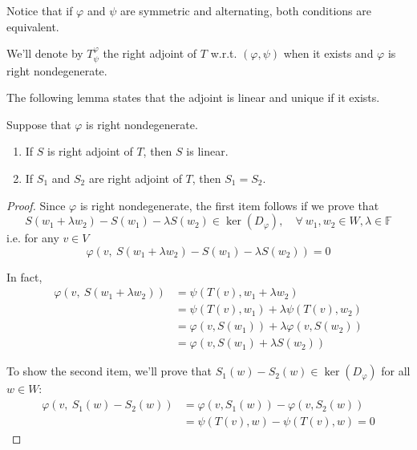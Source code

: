 Notice that if $\varphi$ and $\psi$ are symmetric and alternating, both conditions are equivalent. 

We'll denote by $T_\psi^\varphi$ the right adjoint of $T$ w.r.t. $(\varphi, \psi)$ when it exists and $\varphi$ is right nondegenerate. 

The following lemma states that the adjoint is linear and unique if it exists. 

\begin{lemma}\label{lm:202301041030}
  Suppose that $\varphi$ is right nondegenerate. 
  \begin{enumerate}
    \item If $S$ is right adjoint of $T$, then $S$ is linear. 
    \item If $S_1$ and $S_2$ are right adjoint of $T$, then $S_1 = S_2$.
  \end{enumerate}
\end{lemma}

\begin{proof}
  Since $\varphi$ is right nondegenerate, the first item follows if we prove that 
  \[
    S(w_1 + \lambda w_2) - S(w_1) - \lambda S(w_2) \in \ker(D_\varphi), \quad \forall~ w_1, w_2 \in W, \lambda \in \mathbb{F}
  \]
  i.e. for any $v \in V$
  \[
    \varphi(v, ~S(w_1 + \lambda w_2) - S(w_1) - \lambda S(w_2)) = 0
  \]

  In fact, 
  \begin{equation*}
    \begin{aligned}
      \varphi(v, ~S(w_1 + \lambda w_2)) &= \psi(T(v), w_1 + \lambda w_2) \\
      &= \psi(T(v), w_1) + \lambda \psi(T(v), w_2) \\
      &= \varphi(v, S(w_1)) + \lambda \varphi(v, S(w_2)) \\
      &= \varphi(v, S(w_1) + \lambda S(w_2))
    \end{aligned}
  \end{equation*}

  To show the second item, we'll prove that $S_1(w) - S_2(w) \in \ker(D_\varphi)$ for all $w \in W$: 
  \begin{equation*}
    \begin{aligned}
      \varphi(v, ~S_1(w) - S_2(w)) &= \varphi(v, S_1(w)) - \varphi(v, S_2(w)) \\
      &= \psi(T(v), w) - \psi(T(v), w) = 0 
    \end{aligned}
  \end{equation*}
\end{proof}

